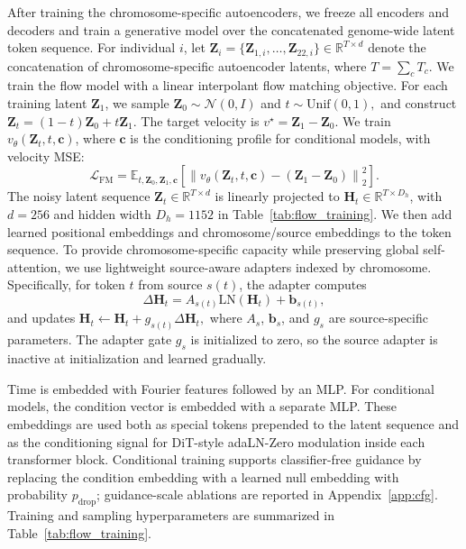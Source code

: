 \documentclass{article}
\begin{document}
After training the chromosome-specific autoencoders, we freeze all encoders and decoders and train a generative model over the concatenated genome-wide latent token sequence. For individual \(i\), let \(\boldsymbol Z_i=\{\boldsymbol Z_{1,i},\ldots,\boldsymbol Z_{22,i}\}\in\mathbb R^{T\times d}\) denote the concatenation of chromosome-specific autoencoder latents, where \(T=\sum_c T_c\). We train the flow model with a linear interpolant flow matching objective. For each training latent \({\boldsymbol Z}_1\), we sample
\(
\boldsymbol Z_0\sim \mathcal N(0,I)
\) and 
\(
t\sim \mathrm{Unif}(0,1),
\)
and construct
\(
\boldsymbol Z_t = (1-t)\boldsymbol Z_0 + t{\boldsymbol Z}_1.
\)
The target velocity is
\(
v^\star = {\boldsymbol Z}_1-\boldsymbol Z_0.
\)
We train \(v_\theta(\boldsymbol Z_t,t,\boldsymbol c)\), where \(\boldsymbol c\) is the conditioning profile for conditional models, with velocity MSE:
\[
\mathcal L_{\mathrm{FM}}
=
\mathbb E_{t,\boldsymbol Z_0,{\boldsymbol Z}_1,\boldsymbol c}
\left[
\left\|
v_\theta(\boldsymbol Z_t,t,\boldsymbol c)
-
({\boldsymbol Z}_1-\boldsymbol Z_0)
\right\|_2^2
\right].
\]
The noisy latent sequence \(\boldsymbol Z_t\in\mathbb R^{T\times d}\) is linearly projected to \(\boldsymbol H_t\in\mathbb R^{T\times D_h}\), with \(d=256\) and hidden width \(D_h=1152\) in Table~\ref{tab:flow_training}.
We then add learned positional embeddings and chromosome/source embeddings to the token sequence. To provide chromosome-specific capacity while preserving global self-attention, we use lightweight source-aware adapters indexed by chromosome. Specifically, for token \(t\) from source \(s(t)\), the adapter computes
\[
\Delta \boldsymbol H_t
=
A_{s(t)}\mathrm{LN}(\boldsymbol H_t)+\boldsymbol b_{s(t)},
\]
and updates
\(
\boldsymbol H_t
\leftarrow
\boldsymbol H_t
+
g_{s(t)}\Delta \boldsymbol H_t ,
\)
where \(A_s\), \(\boldsymbol b_s\), and \(g_s\) are source-specific parameters. The adapter gate \(g_s\) is initialized to zero, so the source adapter is inactive at initialization and learned gradually.


Time is embedded with Fourier features followed by an MLP. For conditional models, the condition vector is embedded with a separate MLP. These embeddings are used both as special tokens prepended to the latent sequence and as the conditioning signal for DiT-style adaLN-Zero modulation \cite{peebles2023scalable} inside each transformer block. Conditional training supports classifier-free guidance by replacing the condition embedding with a learned null embedding with probability \(p_{\mathrm{drop}}\); guidance-scale ablations are reported in Appendix~\ref{app:cfg}. Training and sampling hyperparameters are summarized in Table~\ref{tab:flow_training}.
\end{document}
